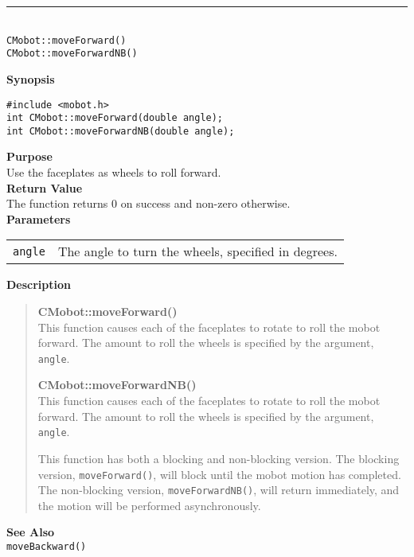 \noindent
\vspace{5pt}
\rule{4.5in}{0.015in}\\
\noindent
{\LARGE \texttt{CMobot::moveForward()}}\\
{\LARGE \texttt{CMobot::moveForwardNB()}}\\
{}

\noindent
{\bf Synopsis}
\vspace{-8pt}
\begin{verbatim}
#include <mobot.h>
int CMobot::moveForward(double angle);
int CMobot::moveForwardNB(double angle);
\end{verbatim}

\noindent
{\bf Purpose}\\
Use the faceplates as wheels to roll forward.\\

\noindent
{\bf Return Value}\\
The function returns 0 on success and non-zero otherwise.\\

\noindent
{\bf Parameters}\\
\vspace{-0.1in}
\begin{description}
\item               
\begin{tabular}{p{15 mm}p{145 mm}}
\texttt{angle} & The angle to turn the wheels, specified in degrees.\\
\end{tabular}
\end{description}

\noindent
{\bf Description}\\
\vspace{-12pt}
\begin{quote}
{\bf CMobot::moveForward()}\\
This function causes each of the faceplates to rotate to roll the
mobot forward. The amount to roll the wheels is specified by the argument,
\texttt{angle}.

{\bf CMobot::moveForwardNB()}\\
This function causes each of the faceplates to rotate to roll the
mobot forward. The amount to roll the wheels is specified by the argument,
\texttt{angle}.

This function has both a blocking and non-blocking version.
The blocking version, \texttt{moveForward()}, will block until the
mobot motion has completed. The non-blocking version, \texttt{moveForwardNB()},
will return immediately, and the motion will be performed asynchronously.\\
\end{quote}

\noindent
{\bf See Also}\\
\texttt{moveBackward()}

